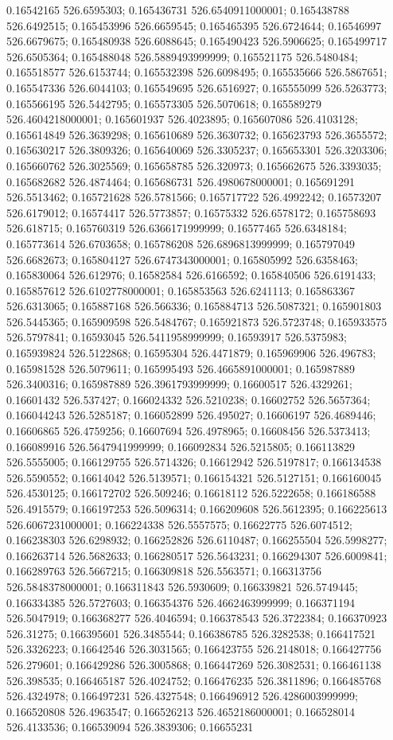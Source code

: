 0.16542165 526.6595303; 0.165436731 526.6540911000001; 0.165438788 526.6492515; 0.165453996 526.6659545; 0.165465395 526.6724644; 0.16546997 526.6679675; 0.165480938 526.6088645; 0.165490423 526.5906625; 0.165499717 526.6505364; 0.165488048 526.5889493999999; 0.165521175 526.5480484; 0.165518577 526.6153744; 0.165532398 526.6098495; 0.165535666 526.5867651; 0.165547336 526.6044103; 0.165549695 526.6516927; 0.165555099 526.5263773; 0.165566195 526.5442795; 0.165573305 526.5070618; 0.165589279 526.4604218000001; 0.165601937 526.4023895; 0.165607086 526.4103128; 0.165614849 526.3639298; 0.165610689 526.3630732; 0.165623793 526.3655572; 0.165630217 526.3809326; 0.165640069 526.3305237; 0.165653301 526.3203306; 0.165660762 526.3025569; 0.165658785 526.320973; 0.165662675 526.3393035; 0.165682682 526.4874464; 0.165686731 526.4980678000001; 0.165691291 526.5513462; 0.165721628 526.5781566; 0.165717722 526.4992242; 0.16573207 526.6179012; 0.16574417 526.5773857; 0.16575332 526.6578172; 0.165758693 526.618715; 0.165760319 526.6366171999999; 0.16577465 526.6348184; 0.165773614 526.6703658; 0.165786208 526.6896813999999; 0.165797049 526.6682673; 0.165804127 526.6747343000001; 0.165805992 526.6358463; 0.165830064 526.612976; 0.16582584 526.6166592; 0.165840506 526.6191433; 0.165857612 526.6102778000001; 0.165853563 526.6241113; 0.165863367 526.6313065; 0.165887168 526.566336; 0.165884713 526.5087321; 0.165901803 526.5445365; 0.165909598 526.5484767; 0.165921873 526.5723748; 0.165933575 526.5797841; 0.16593045 526.5411958999999; 0.16593917 526.5375983; 0.165939824 526.5122868; 0.16595304 526.4471879; 0.165969906 526.496783; 0.165981528 526.5079611; 0.165995493 526.4665891000001; 0.165987889 526.3400316; 0.165987889 526.3961793999999; 0.16600517 526.4329261; 0.16601432 526.537427; 0.166024332 526.5210238; 0.16602752 526.5657364; 0.166044243 526.5285187; 0.166052899 526.495027; 0.16606197 526.4689446; 0.16606865 526.4759256; 0.16607694 526.4978965; 0.16608456 526.5373413; 0.166089916 526.5647941999999; 0.166092834 526.5215805; 0.166113829 526.5555005; 0.166129755 526.5714326; 0.16612942 526.5197817; 0.166134538 526.5590552; 0.16614042 526.5139571; 0.166154321 526.5127151; 0.166160045 526.4530125; 0.166172702 526.509246; 0.16618112 526.5222658; 0.166186588 526.4915579; 0.166197253 526.5096314; 0.166209608 526.5612395; 0.166225613 526.6067231000001; 0.166224338 526.5557575; 0.16622775 526.6074512; 0.166238303 526.6298932; 0.166252826 526.6110487; 0.166255504 526.5998277; 0.166263714 526.5682633; 0.166280517 526.5643231; 0.166294307 526.6009841; 0.166289763 526.5667215; 0.166309818 526.5563571; 0.166313756 526.5848378000001; 0.166311843 526.5930609; 0.166339821 526.5749445; 0.166334385 526.5727603; 0.166354376 526.4662463999999; 0.166371194 526.5047919; 0.166368277 526.4046594; 0.166378543 526.3722384; 0.166370923 526.31275; 0.166395601 526.3485544; 0.166386785 526.3282538; 0.166417521 526.3326223; 0.16642546 526.3031565; 0.166423755 526.2148018; 0.166427756 526.279601; 0.166429286 526.3005868; 0.166447269 526.3082531; 0.166461138 526.398535; 0.166465187 526.4024752; 0.166476235 526.3811896; 0.166485768 526.4324978; 0.166497231 526.4327548; 0.166496912 526.4286003999999; 0.166520808 526.4963547; 0.166526213 526.4652186000001; 0.166528014 526.4133536; 0.166539094 526.3839306; 0.16655231 
